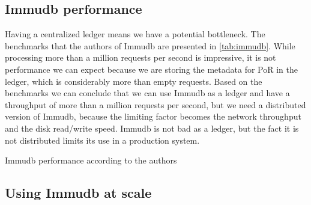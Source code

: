 \subsection{Immudb performance}

Having a centralized ledger means we have a potential bottleneck.
The benchmarks that the authors of Immudb are presented in \autoref{tab:immudb}.
While processing more than a million requests per second is impressive,
it is not performance we can expect because we are storing the metadata for PoR in the ledger,
which is considerably more than empty requests.
Based on the benchmarks we can conclude that we can use Immudb as a ledger and have
a throughput of more than a million requests per second,
but we need a distributed version of Immudb,
because the limiting factor becomes the network throughput and the disk read/write speed.
Immudb is not bad as a ledger, but the fact it is not distributed limits its use in a production system.

\begin{table}
  \myfloatalign
  \caption{Immudb performance according to the authors \cite{immudb-gh}}
  \label{tab:immudb}
\end{table} 

\subsection{Using Immudb at scale}

